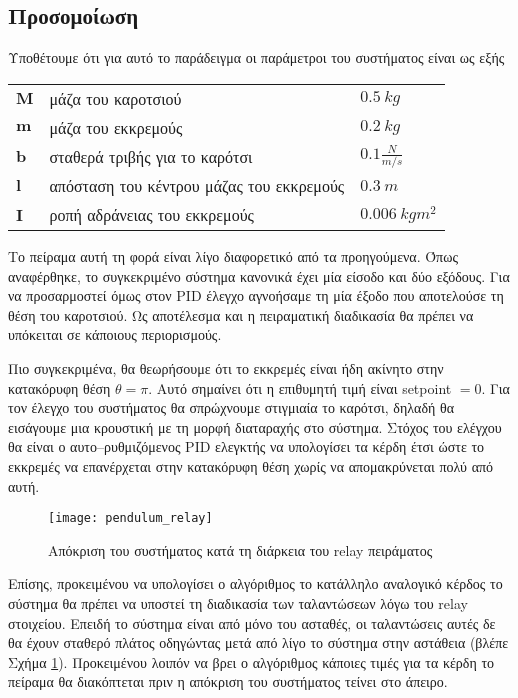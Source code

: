 \subsection{Προσομοίωση}

Υποθέτουμε ότι για αυτό το παράδειγμα οι παράμετροι του συστήματος είναι ως εξής
\begin{flushleft}
\begin{tabular}{lll}
$\mathbf{M}$ & μάζα του καροτσιού & $0.5\ kg$ \\  
$\mathbf{m}$ & μάζα του εκκρεμούς & $0.2\ kg$ \\ 
$\mathbf{b}$ & σταθερά τριβής για το καρότσι & $0.1 \frac{N}{m/s}$ \\ 
$\mathbf{l}$ & απόσταση του κέντρου μάζας του εκκρεμούς & $0.3\ m$ \\ 
$\mathbf{I}$ & ροπή αδράνειας του εκκρεμούς & $0.006\ kgm^2$ \\ 
\end{tabular}
\end{flushleft}
 
Το πείραμα αυτή τη φορά είναι λίγο διαφορετικό από τα προηγούμενα. Όπως αναφέρθηκε, το συγκεκριμένο σύστημα κανονικά έχει μία είσοδο και δύο εξόδους. Για να προσαρμοστεί όμως στον PID έλεγχο αγνοήσαμε τη μία έξοδο που αποτελούσε τη θέση του καροτσιού. Ως αποτέλεσμα και η πειραματική διαδικασία θα πρέπει να υπόκειται σε κάποιους περιορισμούς.

Πιο συγκεκριμένα, θα θεωρήσουμε ότι το εκκρεμές είναι ήδη ακίνητο στην κατακόρυφη θέση $\theta = \pi$. Αυτό σημαίνει ότι η επιθυμητή τιμή είναι setpoint $=0$. Για τον έλεγχο του συστήματος θα σπρώχνουμε στιγμιαία το καρότσι, δηλαδή θα εισάγουμε μια κρουστική με τη μορφή διαταραχής στο σύστημα. Στόχος του ελέγχου θα είναι ο αυτο--ρυθμιζόμενος PID ελεγκτής να υπολογίσει τα κέρδη έτσι ώστε το εκκρεμές να επανέρχεται στην κατακόρυφη θέση χωρίς να απομακρύνεται πολύ από αυτή. 

\begin{figure}[h]
  \centering
  \texttt{[image: pendulum\_relay]}
  \caption{Απόκριση του συστήματος κατά τη διάρκεια του relay πειράματος}
  \label{fig:pendulum_relay}
\end{figure}

Επίσης, προκειμένου να υπολογίσει ο αλγόριθμος το κατάλληλο αναλογικό κέρδος το σύστημα θα πρέπει να υποστεί τη διαδικασία των ταλαντώσεων λόγω του relay στοιχείου. Επειδή το σύστημα είναι από μόνο του ασταθές, οι ταλαντώσεις αυτές δε θα έχουν σταθερό πλάτος οδηγώντας μετά από λίγο το σύστημα στην αστάθεια (βλέπε Σχήμα \ref{fig:pendulum_relay}). Προκειμένου λοιπόν να βρει ο αλγόριθμος κάποιες τιμές για τα κέρδη το πείραμα θα διακόπτεται πριν η απόκριση του συστήματος τείνει στο άπειρο. 



